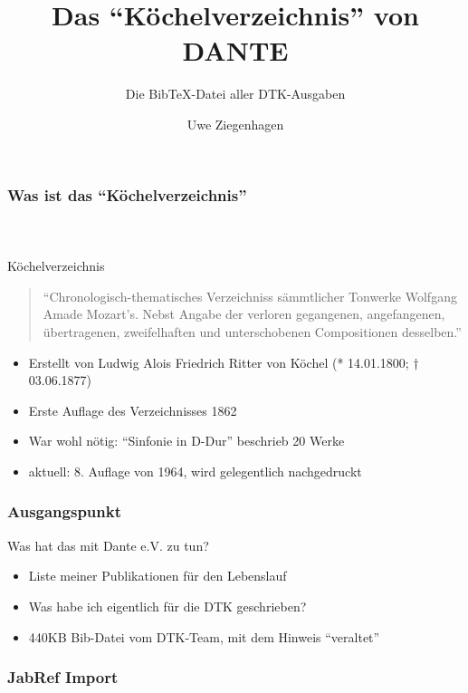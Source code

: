 \documentclass[ngerman]{beamer}
\author{Uwe Ziegenhagen}
\title{Das \enquote{Köchelverzeichnis} von DANTE}
\subtitle{Die Bib\TeX-Datei aller DTK-Ausgaben}
\begin{document}
\begin{frame}

\maketitle

\end{frame}

\begin{frame}
\frametitle{Was ist das \enquote{Köchelverzeichnis}}
\framesubtitle{~}

Köchelverzeichnis

\begin{quote}
\enquote{Chronologisch-thematisches Verzeichniss sämmtlicher Tonwerke Wolfgang Amade Mozart’s. Nebst Angabe der verloren gegangenen, angefangenen, übertragenen, zweifelhaften und unterschobenen Compositionen desselben.}
\end{quote}

\begin{itemize}
	\item Erstellt von Ludwig Alois Friedrich Ritter von Köchel \newline (* 14.01.1800; † 03.06.1877)
	\item Erste Auflage des Verzeichnisses 1862
	\item War wohl nötig: \enquote{Sinfonie in D-Dur} beschrieb 20 Werke
	\item aktuell: 8. Auflage von 1964, wird gelegentlich nachgedruckt
	\end{itemize}


\end{frame}


\begin{frame}
\frametitle{Ausgangspunkt}

Was hat das mit Dante e.V. zu tun?

\begin{itemize}
\item Liste meiner Publikationen für den Lebenslauf
\item Was habe ich eigentlich für die DTK geschrieben?
\item 440KB Bib-Datei vom DTK-Team, mit dem Hinweis \enquote{veraltet}
\end{itemize}
\end{frame}

\begin{frame}
\frametitle{JabRef Import}

\begin{center}
\end{center}
\end{frame}
\end{document}
